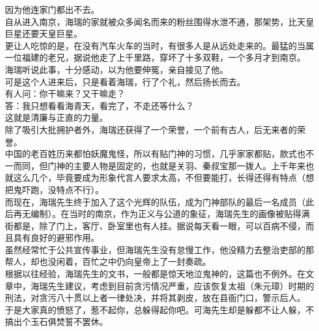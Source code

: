 \begin{multicols}{\theparacolNo}
因为他连家门都出不去。\\

自从进入南京，海瑞的家就被众多闻名而来的粉丝围得水泄不通，那架势，比天皇巨星还要天皇巨星。\\

更让人吃惊的是，在没有汽车火车的当时，有很多人是从远处走来的。最猛的当属一位福建的老兄，据说他走了上千里路，穿坏了十多双鞋，一个多月才到南京。\\

海瑞听说此事，十分感动，以为他要伸冤，亲自接见了他。\\

可是这个人进来后，只是看着海瑞，行了个礼，然后扬长而去。\\

有人问：你干嘛来？又干嘛走？\\

答：我只想看看海青天，看完了，不走还等什么？\\

这就是清廉与正直的力量。\\

除了吸引大批拥护者外，海瑞还获得了一个荣誉，一个前有古人，后无来者的荣誉。\\

中国的老百姓历来都怕妖魔鬼怪，所以有贴门神的习惯，几乎家家都贴，款式也不一而同，但门神的主要人物是固定的，也就是关羽、秦叔宝那一拨人。上千年来也就这么几个，毕竟要成为形象代言人要求太高，不但要能打，长得还得有特点（想把鬼吓跑，没特点不行）。\\

而现在，海瑞先生终于加入了这个光辉的队伍，成为门神部队的最后一名成员（此后再无编制）。在当时的南京，作为正义与公道的象征，海瑞先生的画像被贴得满街都是，除了门上，客厅、卧室里也有人挂。据说每天看一眼，可以百病不侵，而且具有良好的避邪作用。\\

虽然经常忙于公共宣传事业，但海瑞先生没有怠慢工作，他没精力去整治吏部的那帮人，却也没闲着，百忙之中仍向皇帝上了一封奏疏。\\

根据以往经验，海瑞先生的文书，一般都是惊天地泣鬼神的，这篇也不例外。在文章中，海瑞先生建议，考虑到目前贪污情况严重，应该恢复太祖（朱元璋）时期的刑法，对贪污八十贯以上者一律处决，并将其剥皮，放在县衙门口，警示后人。\\

于是大家真的愤怒了，惹不起你，总躲得起你吧。可海先生却是躲都不让人躲，不搞出个玉石俱焚誓不罢休。\\


\end{multicols}
